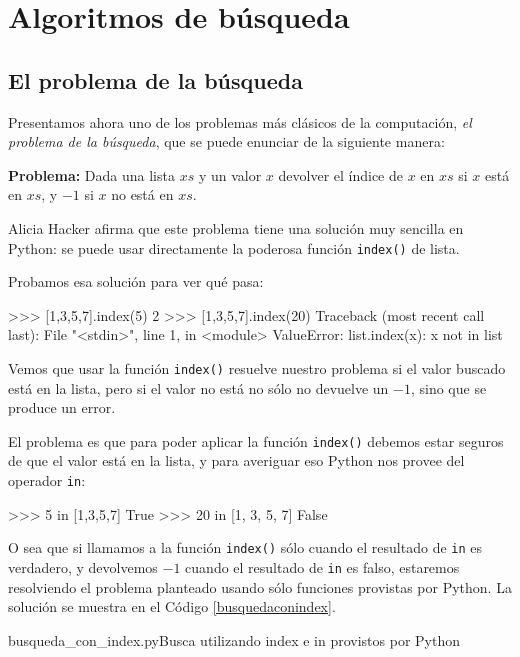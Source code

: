 \chapter[Algoritmos de búsqueda]{Algoritmos de búsqueda}

\section{El problema de la búsqueda}

Presentamos ahora uno de los problemas más clásicos de la computación, {\it el
problema de la búsqueda}, que se puede enunciar de la siguiente manera:

{\bf Problema: } Dada una lista $xs$ y un valor $x$ devolver el índice de $x$
en $xs$ si $x$ está en $xs$, y $-1$ si $x$ no está en $xs$.

Alicia Hacker afirma que este problema tiene una solución muy sencilla en
Python: se puede usar directamente la poderosa función \lstinline+index()+ de
lista.

Probamos esa solución para ver qué pasa:

\begin{codigo-python-sn}
>>> [1,3,5,7].index(5)
2
>>> [1,3,5,7].index(20)
Traceback (most recent call last):
  File "<stdin>", line 1, in <module>
ValueError: list.index(x): x not in list
\end{codigo-python-sn}

Vemos que usar la función \lstinline+index()+ resuelve nuestro problema si el
valor buscado está en la lista, pero si el valor no está no sólo no devuelve
un $-1$, sino que se produce un error.

El problema es que para poder aplicar la función \lstinline+index()+ debemos
estar seguros de que el valor está en la lista, y para averiguar eso Python
nos provee del operador \lstinline+in+:

\begin{codigo-python-sn}
>>> 5 in [1,3,5,7]
True
>>> 20 in [1, 3, 5, 7]
False
\end{codigo-python-sn}

O sea que si llamamos a la función \lstinline+index()+ sólo cuando el
resultado de \lstinline+in+ es verdadero, y devolvemos $-1$ cuando el
resultado de \lstinline+in+ es falso, estaremos resolviendo el problema
planteado usando sólo funciones provistas por Python. La solución se
muestra en el Código \ref{busquedaconindex}. \\

\begin{codigo}{busqueda\_con\_index.py}{Busca utilizando index e in provistos por Python}
\label{busquedaconindex}

\end{codigo}


